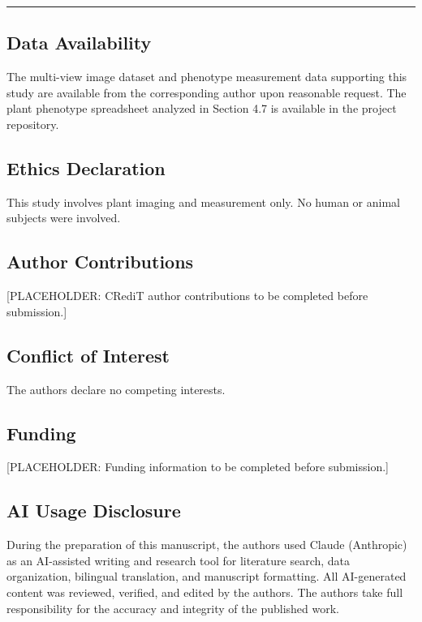 \documentclass[11pt,a4paper]{article}
\begin{document}
\begin{center}\rule{0.5\linewidth}{0.5pt}\end{center}

\subsection{Data Availability}\label{data-availability}

The multi-view image dataset and phenotype measurement data supporting
this study are available from the corresponding author upon reasonable
request. The plant phenotype spreadsheet analyzed in Section 4.7 is
available in the project repository.

\subsection{Ethics Declaration}\label{ethics-declaration}

This study involves plant imaging and measurement only. No human or
animal subjects were involved.

\subsection{Author Contributions}\label{author-contributions}

{[}PLACEHOLDER: CRediT author contributions to be completed before
submission.{]}

\subsection{Conflict of Interest}\label{conflict-of-interest}

The authors declare no competing interests.

\subsection{Funding}\label{funding}

{[}PLACEHOLDER: Funding information to be completed before
submission.{]}

\subsection{AI Usage Disclosure}\label{ai-usage-disclosure}

During the preparation of this manuscript, the authors used Claude
(Anthropic) as an AI-assisted writing and research tool for literature
search, data organization, bilingual translation, and manuscript
formatting. All AI-generated content was reviewed, verified, and edited
by the authors. The authors take full responsibility for the accuracy
and integrity of the published work.
\end{document}
